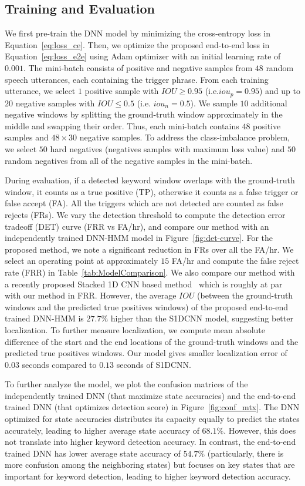 \documentclass{article}
\begin{document}
\subsection{Training and Evaluation}
We first pre-train the DNN model by minimizing the cross-entropy loss in Equation~\eqref{eq:loss_ce}.
Then, we optimize the proposed end-to-end loss in Equation~\eqref{eq:loss_e2e} using Adam optimizer \cite{adam} with an initial learning rate of $0.001$.
The mini-batch consists of positive and negative samples from $48$ random speech utterances, each containing the trigger phrase.
From each training utterance, we select $1$ positive sample with $IOU \ge 0.95$ (i.e.$iou_p = 0.95$) and up to $20$ negative samples with $IOU \le 0.5$ (i.e. $iou_n = 0.5$).
We sample $10$ additional negative windows by splitting the ground-truth window approximately in the middle and swapping their order.
Thus, each mini-batch contains $48$ positive samples and $48 \times 30$ negative samples.
To address the class-imbalance problem, we select $50$ hard negatives (negatives samples with maximum loss value) and $50$ random negatives from all of the negative samples in the mini-batch.


During evaluation, if a detected keyword window overlaps with the ground-truth window, it counts as a true positive (TP), otherwise it counts as a false trigger or false accept (FA).
All the triggers which are not detected are counted as false rejects (FRs).
We vary the detection threshold to compute the detection error tradeoff (DET) curve (FRR vs FA/hr), and compare our method with an independently trained DNN-HMM model in Figure~\ref{fig:det-curve}.
For the proposed method, we note a significant reduction in FRs over all the FA/hr.
We select an operating point at approximately $15$ FA/hr and compute the false reject rate (FRR) in Table~\ref{tab:ModelComparison}.
We also compare our method with a recently proposed Stacked 1D CNN based method~\cite{Higuchi2020} which is roughly at par with our method in FRR.
However, the average $IOU$ (between the ground-truth windows and the predicted true positives windows) of the proposed end-to-end trained DNN-HMM is $27.7\%$ higher than the S1DCNN model, suggesting better localization.
To further measure localization, we compute mean absolute difference of the start and the end locations of the ground-truth windows and the predicted true positives windows.
Our model gives smaller localization error of $0.03$ seconds compared to $0.13$ seconds of S1DCNN.

To further analyze the model, we plot the confusion matrices of the independently trained DNN (that maximize state accuracies) and the end-to-end trained DNN (that optimizes detection score) in Figure~\ref{fig:conf_mtx}.
The DNN optimized for state accuracies distributes its capacity equally to predict the states accurately, leading to higher average state accuracy of $68.1\%$.
However, this does not translate into higher keyword detection accuracy.
In contrast, the end-to-end trained DNN has lower average state accuracy of $54.7\%$ (particularly, there is more confusion among the neighboring states) but focuses on key states that are important for keyword detection, leading to higher keyword detection accuracy.
\end{document}
